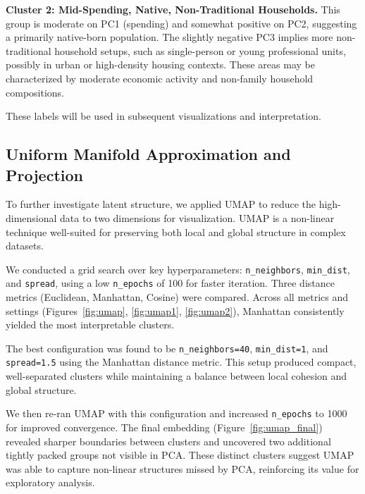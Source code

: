 \documentclass{article}
\begin{document}
\textbf{Cluster 2: Mid-Spending, Native, Non-Traditional Households.}  
This group is moderate on PC1 (spending) and somewhat positive on PC2, suggesting a primarily native-born population. The slightly negative PC3 implies more non-traditional household setups, such as single-person or young professional units, possibly in urban or high-density housing contexts. These areas may be characterized by moderate economic activity and non-family household compositions.

These labels will be used in subsequent visualizations and interpretation.

\subsection{Uniform Manifold Approximation and Projection}

To further investigate latent structure, we applied UMAP to reduce the high-dimensional data to two dimensions for visualization. UMAP is a non-linear technique well-suited for preserving both local and global structure in complex datasets.

We conducted a grid search over key hyperparameters: \texttt{n\_neighbors}, \texttt{min\_dist}, and \texttt{spread}, using a low \texttt{n\_epochs} of 100 for faster iteration. Three distance metrics (Euclidean, Manhattan, Cosine) were compared. Across all metrics and settings (Figures~\ref{fig:umap}, \ref{fig:umap1}, \ref{fig:umap2}), Manhattan consistently yielded the most interpretable clusters.

The best configuration was found to be \texttt{n\_neighbors=40}, \texttt{min\_dist=1}, and \texttt{spread=1.5} using the Manhattan distance metric. This setup produced compact, well-separated clusters while maintaining a balance between local cohesion and global structure.

We then re-ran UMAP with this configuration and increased \texttt{n\_epochs} to 1000 for improved convergence. The final embedding (Figure~\ref{fig:umap_final}) revealed sharper boundaries between clusters and uncovered two additional tightly packed groups not visible in PCA. These distinct clusters suggest UMAP was able to capture non-linear structures missed by PCA, reinforcing its value for exploratory analysis.
\end{document}
